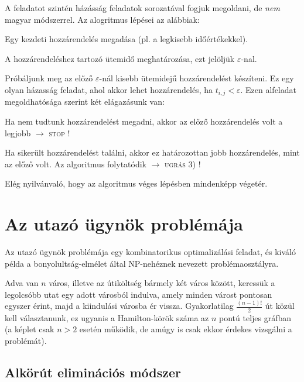 \documentclass[a4paper,12pt,svgnames]{report}
\begin{document}
\begin{multicols}{2}
\firstline A feladatot szintén házásság feladatok sorozatával fogjuk megoldani, de \emph{nem} magyar módszerrel. Az alogritmus lépései az alábbiak:

\begin{numericlist}
\item Egy kezdeti hozzárendelés megadása (pl. a legkisebb időértékekkel).
\item A hozzárendeléshez tartozó ütemidő meghatározása, ezt jelöljük $\varepsilon$-nal.
\item Próbáljunk meg az előző $\varepsilon$-nál kisebb ütemidejű hozzárendelést készíteni. Ez egy olyan házasság feladat, ahol akkor lehet hozzárendelés, ha $t_{i,j}<\varepsilon$. Ezen alfeladat megoldhatósága szerint két elágazásunk van:
    \begin{alphanumericlist}
    \item Ha nem tudtunk hozzárendelést megadni, akkor az előző hozzárendelés volt a legjobb $\rightarrow$ \textsc{stop} !
    \item Ha sikerült hozzárendelést találni, akkor ez határozottan jobb hozzárendelés, mint az előző volt. Az algoritmus folytatódik $\rightarrow$ \textsc{ugrás 3)} !
    \end{alphanumericlist}
\end{numericlist}

Elég nyilvánvaló, hogy az algoritmus véges lépésben mindenképp végetér.

\section{Az utazó ügynök problémája}

\firstline Az utazó ügynök problémája egy kombinatorikus optimalizálási feladat, és kiváló példa a bonyolultság-elmélet által NP-nehéznek nevezett problémaosztályra.

Adva van $n$ város, illetve az útiköltség bármely két város között, keressük a legolcsóbb utat egy adott városból indulva, amely minden várost pontosan egyszer érint, majd a kiindulási városba ér vissza. Gyakorlatilag $\frac{(n-1)!}{2}$ út közül kell választanunk, ez ugyanis a Hamilton-körök száma az $n$ pontú teljes gráfban (a képlet csak $n>2$ esetén működik, de amúgy is csak ekkor érdekes vizsgálni a problémát).

\subsection{Alkörút eliminációs módszer}


\end{multicols}
\end{document}
